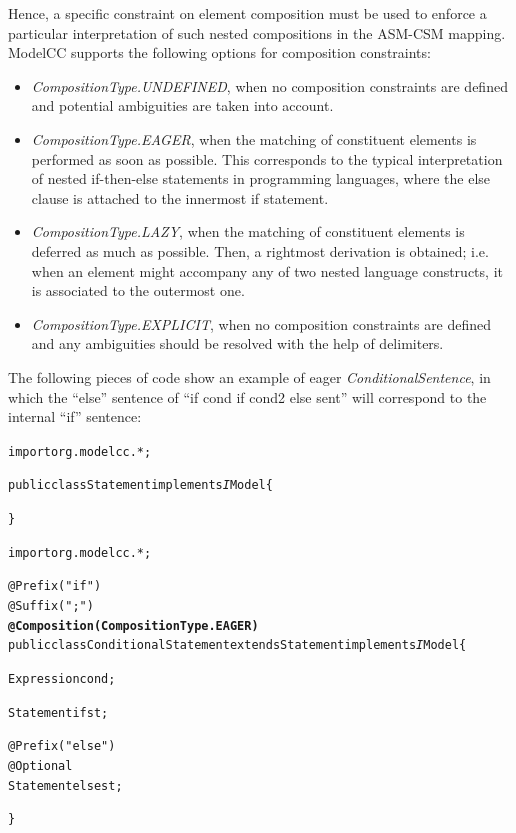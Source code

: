 \documentclass[a4paper,twoside,onecolumn]{article}
\newenvironment{colframe}{%
  \begin{Sbox} 
    \begin{minipage}{.8\columnwidth} 
}{%

  \end{minipage} 
  \end{Sbox} 
  \begin{center} 
    \fcolorbox{black}{MyGray}{\TheSbox} 
  \end{center} 
}
\newcommand{\an}[1]{\emph{#1}} %
\begin{document}
Hence, a specific constraint on element composition must be used to enforce a particular interpretation of such nested compositions in the
ASM-CSM mapping. ModelCC supports the following options for composition constraints:

\begin{itemize}

\item
\an{CompositionType.UNDEFINED}, when no composition constraints are defined and potential ambiguities are taken into account.

\item
\an{CompositionType.EAGER}, when the matching of constituent elements is performed as soon as possible. This corresponds
to the typical interpretation of nested if-then-else statements in programming languages, where the else clause is attached to the innermost if
statement.

\item
\an{CompositionType.LAZY}, when the matching of constituent elements is deferred as much as possible. Then, a rightmost derivation is obtained; i.e. when an
element might accompany any of two nested language constructs, it is associated to the outermost one.

\item
\an{CompositionType.EXPLICIT}, when no composition constraints are defined and any ambiguities should be resolved with the help of delimiters.

\end{itemize}

The following pieces of code show an example of eager \emph{ConditionalSentence}, in which the ``else'' sentence of ``if cond if cond2 else sent'' will correspond to the internal ``if'' sentence:

\begin{colframe}
\begin{alltt}
import org.modelcc.*;

public class Statement implements{\emph IModel} \{

\}
\end{alltt}
\end{colframe}

\begin{colframe}
\begin{alltt}
import org.modelcc.*;

@Prefix("if")
@Suffix(";")
{\bf @Composition(CompositionType.EAGER)}
public class ConditionalStatement extends Statement implements{\emph IModel} \{

  Expression cond;

  Statement ifst;

  @Prefix("else")
  @Optional
  Statement elsest;

\}
\end{alltt}
\end{colframe}
\end{document}
